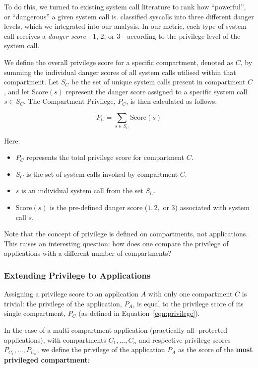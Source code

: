 To do this, we turned to existing system call literature to rank
how ``powerful'', or ``dangerous'' a given system call is. 
\textcite{SYSCALL_RANKINGS} classified syscalls into three different danger
levels, which we integrated into our analysis. In our metric, each type of
system call receives a \textit{danger score} - $1$, $2$, or $3$ - according
to the privilege level of the system call.

We define the overall privilege score for a specific compartment, denoted as
$C$, by summing the individual danger scores of all system calls utilised
within that compartment. Let $S_C$ be the set of unique system calls present
in compartment $C$, and let $\mathrm{Score}(s)$ represent the danger score
assigned to a specific system call $s \in S_C$. The Compartment Privilege, $P_C
$, is then calculated as follows:  

\begin{equation} \label{eqn:privilege} 
    P_C = \sum_{s \in S_C} \mathrm{Score}(s) 
\end{equation} 

Here:
\begin{itemize}
    \item $P_C$ represents the total privilege score for compartment $C$.
    \item $S_C$ is the set of system calls invoked by compartment $C$.
    \item $s$ is an individual system call from the set $S_C$.
    \item $\mathrm{Score}(s)$ is the pre-defined danger score ($1, 2,$ or $3$)
        associated with system call $s$.
\end{itemize}

Note that the concept of privilege is defined on compartments, not applications.
This raises an interesting question: how does one compare the privilege of
applications with a different number of compartments?

\subsubsection{Extending Privilege to Applications}\label{subsubsec:eval-quant-priv-apps}

Assigning a privilege score to an application $A$ with only one compartment $C
$ is trivial: the privilege of the application, $P_A$, is equal to the
privilege score of its single compartment, $P_C$ (as defined in 
Equation~\ref{eqn:privilege}). 

In the case of a multi-compartment application (practically all \af-protected
applications), with compartments $C_1, \dots, C_n$ and respective
privilege scores $P_{C_1}, \dots, P_{C_n}$, we define the privilege of the
application $P_A$ as the score of the \textbf{most privileged compartment}: 

